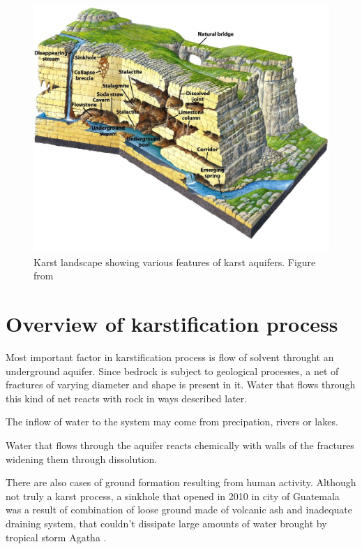 \begin{figure}
  \centerline{\includegraphics[width=480px]{chapters/karstification/karst_landscape.jpg}}
  \caption{Karst landscape showing various features of karst aquifers.
    Figure from \cite{marshak2006}}
\end{figure}


\section{Overview of karstification process}

Most important factor in karstification process is flow of solvent throught an
underground aquifer. Since bedrock is subject to geological processes, a
net of fractures of varying diameter and shape is present in it. Water that flows
through this kind of net reacts with rock in ways described later.

The inflow of water to the system may come from precipation, rivers or lakes.

Water that flows through the aquifer reacts chemically with walls of the fractures
widening them through dissolution.

There are also cases of ground formation resulting from human activity.
Although not truly a karst process, a sinkhole that opened in 2010 in city of
Guatemala was a result of combination of loose ground made of volcanic ash and
inadequate draining system, that couldn't dissipate large amounts of water
brought by tropical storm Agatha \parencite{times2010}.

